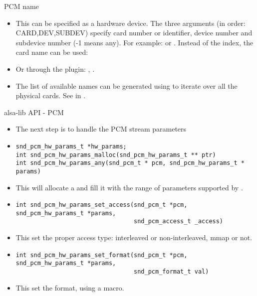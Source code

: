 \begin{frame}{PCM name}
  \begin{itemize}
  \item This can be specified as a hardware device. The three
    arguments (in order: CARD,DEV,SUBDEV) specify card number or
    identifier, device number and subdevice number (-1 means any). For
    example:  or . Instead of the index, the
    card name can be used: 
  \item Or through the  plugin: ,
    .
  \item The list of available names can be generated using
     to iterate over all the physical cards. See
     in .
  \end{itemize}
\end{frame}

\begin{frame}[fragile]{alsa-lib API - PCM}
  \begin{itemize}
  \item The next step is to handle the PCM stream parameters
  \item
    \begin{block}{}
    \fontsize{9}{9}\selectfont
      \begin{verbatim}
snd_pcm_hw_params_t *hw_params;
int snd_pcm_hw_params_malloc(snd_pcm_hw_params_t ** ptr)
int snd_pcm_hw_params_any(snd_pcm_t * pcm, snd_pcm_hw_params_t * params)
      \end{verbatim}
      \end{block}
    \item This will allocate a  and fill it
      with the range of parameters supported by .
  \item
    \begin{block}{}
    \fontsize{9}{9}\selectfont
      \begin{verbatim}
int snd_pcm_hw_params_set_access(snd_pcm_t *pcm, snd_pcm_hw_params_t *params,
                                 snd_pcm_access_t _access)
      \end{verbatim}
    \end{block}
    \item This set the proper access type: interleaved or
      non-interleaved, mmap or not.
  \item
    \begin{block}{}
    \fontsize{9}{9}\selectfont
      \begin{verbatim}
int snd_pcm_hw_params_set_format(snd_pcm_t *pcm, snd_pcm_hw_params_t *params,
                                 snd_pcm_format_t val)
      \end{verbatim}
    \end{block}
    \item This set the format, using a  macro.
  \end{itemize}
\end{frame}

